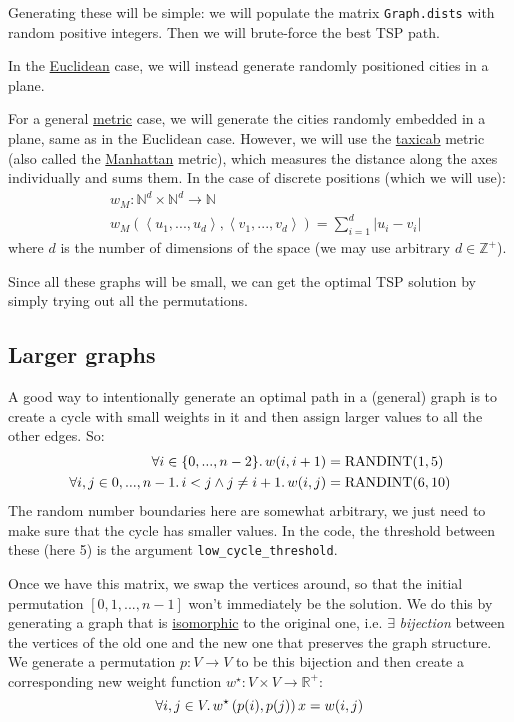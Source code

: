 \documentclass{article}
\newcommand{\randint}{\operatorname{RANDINT}}
\newcommand{\uu}[1]{\underline{#1}}
\newcommand{\ii}[1]{\textit{#1}}
\newcommand{\py}[1]{\lstinline[language=Python]{#1}}
\begin{document}
Generating these will be simple: we will populate the matrix
\py{Graph.dists} with random positive integers. Then we will
brute-force the best TSP path.

In the \uu{Euclidean} case, we will instead generate randomly positioned
cities in a plane.

For a general \uu{metric} case, we will generate the cities randomly embedded
in a plane, same as in the Euclidean case. However, we will use
the \uu{taxicab} metric (also called the \uu{Manhattan} metric), which measures
the distance along the axes individually and sums them. In the case of discrete
positions (which we will use):
\begin{align*}
  & w_M: \mathbb{N}^d \times \mathbb{N}^d \to \mathbb{N} \\
  & w_M\left(\left<u_1,...,u_d\right>, \left<v_1,...,v_d\right>\right) = \sum_{i=1}^d \left|u_i - v_i\right|
\end{align*}
where $d$ is the number of dimensions of the space (we may use arbitrary
$d\in\mathbb{Z}^{+}$).

Since all these graphs will be small, we can get the optimal TSP solution by
simply trying out all the permutations.

\subsection{Larger graphs}

A good way to intentionally generate an optimal path in a (general) graph is to create
a cycle with small weights in it and then assign larger values to all the other
edges. So:
\begin{align*}\forall i\in\{0,...,n-2\}\ldotp w(i,i+1) & =\randint(1,5)\\
  \forall i,j\in{0,...,n-1}\ldotp i< j \wedge j\ne i+1 \ldotp
  w(i,j) & = \randint(6,10) \\
\end{align*}
The random number boundaries here are somewhat arbitrary, we just need to make
sure that the cycle has smaller values. In the code, the threshold between these
(here 5) is the argument \py{low_cycle_threshold}.

Once we have this matrix, we swap the vertices around, so that the initial
permutation $[0,1,...,n-1]$ won't immediately be the solution. We do this by
generating a graph that is \uu{isomorphic} to the original one, i.e. $\exists$
\ii{bijection} between the vertices of the old one and the new one that preserves
the graph structure. We
generate a permutation $p:V\to V$ to be this bijection and then create a corresponding
new weight function $w^\star:V\times V \to \mathbb{R}^{+}$:
\[ \forall i,j\in V \ldotp
  w^\star\left( p(i), p(j) \right)
x  = w(i,j) \]
\end{document}
